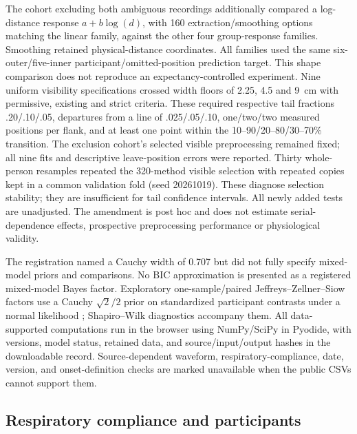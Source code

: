 The cohort excluding both ambiguous recordings additionally compared a log-distance response $a+b\log(d)$, with 160 extraction/smoothing options matching the linear family, against the other four group-response families. Smoothing retained physical-distance coordinates. All families used the same six-outer/five-inner participant/omitted-position prediction target. This shape comparison does not reproduce an expectancy-controlled experiment. Nine uniform visibility specifications crossed width floors of 2.25, 4.5 and 9~cm with permissive, existing and strict criteria. These required respective tail fractions .20/.10/.05, departures from a line of .025/.05/.10, one/two/two measured positions per flank, and at least one point within the 10--90/20--80/30--70\% transition. The exclusion cohort's selected visible preprocessing remained fixed; all nine fits and descriptive leave-position errors were reported. Thirty whole-person resamples repeated the 320-method visible selection with repeated copies kept in a common validation fold (seed 20261019). These diagnose selection stability; they are insufficient for tail confidence intervals. All newly added tests are unadjusted. The amendment is post hoc and does not estimate serial-dependence effects, prospective preprocessing performance or physiological validity.

The registration named a Cauchy width of 0.707 but did not fully specify mixed-model priors and comparisons. No BIC approximation is presented as a registered mixed-model Bayes factor. Exploratory one-sample/paired Jeffreys--Zellner--Siow factors use a Cauchy $\sqrt{2}/2$ prior on standardized participant contrasts under a normal likelihood \citep{Rouder2009BayesianT}; Shapiro--Wilk diagnostics accompany them. All data-supported computations run in the browser using NumPy/SciPy in Pyodide, with versions, model status, retained data, and source/input/output hashes in the downloadable record. Source-dependent waveform, respiratory-compliance, date, version, and onset-definition checks are marked unavailable when the public CSVs cannot support them.

\subsection{Respiratory compliance and participants}

